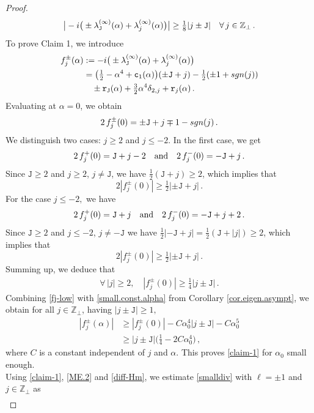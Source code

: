 \documentclass[10pt,a4paper]{amsart}
\newcommand{\Z}{{\mathbb Z}}
\newcommand{\im}{{\rm i}}
\newcommand{\tJ}{{\mathtt J}}
\newcommand{\tc}{{\mathtt c}}
\newcommand{\tr}{{\mathtt r}}
\begin{document}
\begin{proof}
    \begin{equation}\label{claim-1}
    	\big| -\im \big( \pm \lambda_{\tJ}^{(\infty)}(\alpha) + \lambda_{j}^{(\infty)}(\alpha) \big)  \big| \geq \tfrac18|j\pm \tJ| \quad \forall \, j \in\Z_{\perp} \,.
    \end{equation} 
To prove Claim 1, we introduce
\begin{align}
  		f_j^{\pm}(\alpha)&:=-\im \big( \pm \lambda_{\tJ}^{(\infty)}(\alpha)+ \lambda_{j}^{(\infty)}(\alpha) \big)  \\
        & = \big( \tfrac12 - \alpha^4 +\tc_{1}(\alpha)  \big)(\pm \tJ  +j) - \tfrac12(\pm 1 +{\rm sgn}(j)) \\
  		& \quad \pm \tr_{\tJ}(\alpha) + \tfrac32\alpha^4 \delta_{2,j} + \tr_{j}(\alpha)\,.\label{ell.pm1}
  	\end{align}
Evaluating at $\alpha=0$, we obtain
$$
2 \,f_j^{\pm}(0)=  \pm\tJ  + j\mp1-{\rm sgn}(j)\,.
$$
We distinguish two cases:  $j\geqslant2$ and $j\leqslant-2.$ In the first case, we get
$$
2 \,f_j^{+}(0)=  \tJ  + j-2\quad\hbox{and}\quad 2 \,f_j^{-}(0)= - \tJ  + j\,.
$$
Since $\tJ\geqslant2$ and $j\geqslant2$, $j\neq \tJ$, we have $\frac12(\tJ+j)\geq 2$, which implies that
$$
2|f_j^{\pm}(0)|\geqslant \tfrac12|\pm \tJ+j|\,.
$$
For  the case $j\leqslant-2,$ we have
$$
2 \,f_j^{+}(0)=  \tJ  + j\quad\hbox{and}\quad 2 \,f_j^{-}(0)= - \tJ  + j+2\,.
$$
Since $\tJ\geq 2$ and $j\leq -2$, $j\neq -\tJ$ we have $\frac12|-\tJ+j|=\frac12(\tJ+|j|)\geq 2$, which implies that
$$
2|f_j^{\pm}(0)|\geqslant \tfrac12|\pm \tJ+j|\,.
$$
Summing up, we deduce that
\begin{align}\label{fj-low}
\forall \,|j|\geqslant 2,\quad |f_j^{\pm}(0)|\geqslant \tfrac14|j\pm \tJ|\,.
\end{align}
Combining \eqref{fj-low} with \eqref{small.const.alpha} from Corollary \ref{cor.eigen.asympt}, we obtain for all $j \in \mathbb{Z}_\perp$, having $|j \pm \tJ| \geqslant 1,$
\begin{align}
    |f_j^\pm(\alpha)|& \geqslant |f_j^\pm(0)|-C\alpha_0^4|j\pm \tJ|-C\alpha_0^5\\
   & \geqslant |j\pm \tJ|\big(\tfrac14-2C\alpha_0^4\big) \,,
\end{align}
where  $C$ is a constant independent of $j$ and $\alpha.$ This proves \eqref{claim-1}  for $\alpha_0$ small enough.
  \\[1mm]
  Using \eqref{claim-1},  \eqref{ME.2} and \eqref{diff-Hm}, we estimate \eqref{smalldiv} with $\ell = \pm 1$  and $j\in \Z_{\perp}$ as
  \begin{align}

\end{align}
\end{proof}
\end{document}
